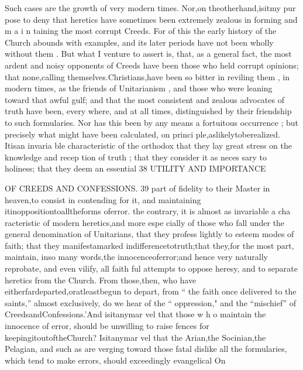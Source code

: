 \documentclass[
]{book}
\begin{document}
Such cases are the growth of very modern times. Nor,on theotherhand,isitmy pur pose to deny that heretics have sometimes
been extremely zealous in forming and m a i n taining the most corrupt Creeds. For of this the early history of the Church abounds with examples, and its later periods have not been wholly without them . But what I venture to assert is, that, as a general fact, the most ardent and noisy opponents of Creeds have been those who held corrupt opinions; that none,calling themselves.Christians,have been so bitter in reviling them , in modern times, as the friends of Unitarianism , and those who were leaning toward that awful gulf; and that the most consistent and zealous advocates of truth have been, every where, and at all
times, distinguished by their friendship to such formularies. Nor has this been by any
means a fortuitous occurrence ; but precisely what might have been calculated, on princi ple,aslikelytoberealized. Itisan invaria
ble characteristic of the orthodox that they lay great stress on the knowledge and recep tion of truth ; that they consider it as neces sary to holiness; that they deem an essential
38 UTILITY AND IMPORTANCE

OF CREEDS AND CONFESSIONS. 39
part of fidelity to their Master in heaven,to
consist in contending for it, and maintaining itinoppositiontoalltheforms oferror.
the contrary, it is almost as invariable a cha racteristic of modern heretics,and more espe
cially of those who fall under the general denomination of Unitarians, that they profess
lightly to esteem modes of faith; that they manifestamarked indifferencetotruth;that
they,for the most part, maintain, inso many words,the innocenceoferror;and hence very naturally reprobate, and even vilify, all faith ful attempts to oppose heresy, and to separate
heretics from the Church. From those,then, who have eitherfardeparted,oratleastbegun to depart, from `` the faith once delivered to
the saints,'' almost exclusively, do we hear of the `` oppression," and the ``mischief'' of CreedsandConfessions.'And isitanymar vel that those w h o maintain the innocence of
error, should be unwilling to raise fences for
keepingitoutoftheChurch? Isitanymar vel that the Arian,the Socinian,the Pelagian,
and such as are verging toward those fatal
dislike all the formularies, which tend to make
errors, should exceedingly evangelical
On
\end{document}
